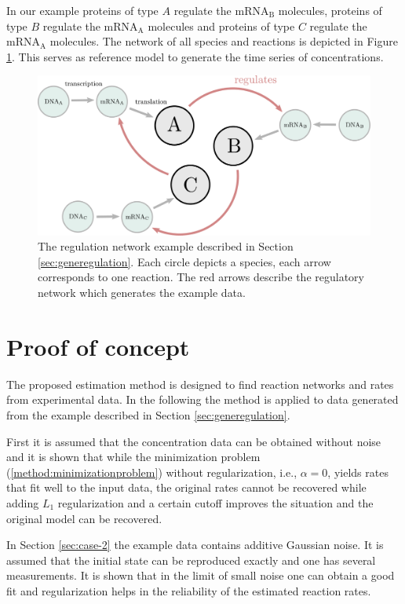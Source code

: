 \documentclass[oneside, abstracton, titlepage]{scrartcl}
\begin{document}
    In our example proteins of type $A$ regulate the mRNA$_\mathrm{B}$ molecules, proteins of type $B$ regulate the mRNA$_\mathrm{A}$ molecules and proteins of type $C$ regulate the mRNA$_\mathrm{A}$ molecules. The network of all species and reactions is depicted in Figure \ref{fig:network}. This serves as reference model to generate the time series of concentrations.
    \begin{figure}
        \centering
        \includegraphics[width=.5\textwidth]{./figures_tex/gene_regulation_full.pdf}
        \caption{The regulation network example described in Section \ref{sec:generegulation}. Each circle depicts a species, each arrow corresponds to one reaction. The red arrows describe the regulatory network which generates the example data.}
        \label{fig:network}
    \end{figure}

	\section{Proof of concept}\label{sec:proof-of-concept}
	
	The proposed estimation method is designed to find reaction networks and rates from experimental data. In the following the method is applied to data generated from the example described in Section \ref{sec:generegulation}.

	First it is assumed that the concentration data can be obtained without noise and it is shown that while the minimization problem (\ref{method:minimizationproblem}) without regularization, i.e., $\alpha=0$, yields rates that fit well to the input data, the original rates cannot be recovered while adding $L_1$ regularization and a certain cutoff improves the situation and the original model can be recovered.
	
	In Section \ref{sec:case-2} the example data contains additive Gaussian noise. It is assumed that the initial state can be reproduced exactly and one has several measurements. It is shown that in the limit of small noise one can obtain a good fit and regularization helps in the reliability of the estimated reaction rates.
	
\end{document}
